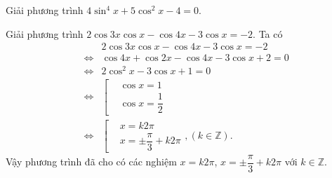 \begin{bt}%

	Giải phương trình $4\sin^4x+5\cos^2x-4=0$. 
\end{bt}

\begin{bt}%

	Giải phương trình $2\cos 3x\cos x-\cos 4x-3\cos x=-2$.
	\loigiai
	{
		Ta có
		\allowdisplaybreaks
		\begin{eqnarray*}
			&& 2\cos 3x\cos x-\cos 4x-3\cos x=-2 \\
			&\Leftrightarrow & \cos 4x + \cos 2x - \cos 4x -3\cos x + 2=0 \\
			&\Leftrightarrow & 2\cos^2 x-3\cos x+1=0 \\
			&\Leftrightarrow & \left[\begin{aligned}&\cos x=1 \\&\cos x=\dfrac{1}{2}\end{aligned}\right. \\
			&\Leftrightarrow & \left[\begin{aligned}&x=k2\pi \\&x=\pm\dfrac{\pi}{3}+k2\pi\end{aligned}\right. , \left(k\in\mathbb{Z}\right).
		\end{eqnarray*}
		Vậy phương trình đã cho có các nghiệm $x=k2\pi$, $x=\pm\dfrac{\pi}{3}+k2\pi$ với $k\in\mathbb{Z}$.
	}
\end{bt}

